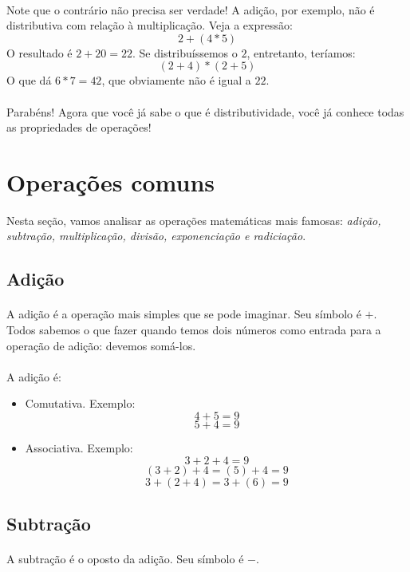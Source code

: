 \documentclass[12pt]{article}
\begin{document}
\paragraph{}
Note que o contrário não precisa ser verdade! A adição, por exemplo, não é 
distributiva com relação à multiplicação. Veja a expressão:
$$2 + (4*5)$$
O resultado é $2 + 20 = 22$. Se distribuíssemos o $2$, entretanto, teríamos:
$$(2+4) * (2+5)$$
O que dá $6*7 = 42$, que obviamente não é igual a $22$.
\paragraph{}
Parabéns! Agora que você já sabe o que é distributividade, você já conhece 
todas as propriedades de operações!

\section{Operações comuns}
Nesta seção, vamos analisar as operações matemáticas mais famosas: 
\textit{adição, subtração, multiplicação, divisão, exponenciação e radiciação}.

\subsection{Adição}
\paragraph{}
A adição é a operação mais simples que se pode imaginar. Seu símbolo é $+$.
Todos sabemos o que fazer quando temos dois números como entrada para a operação
de adição: devemos somá-los. 
\paragraph{}
A adição é:
\begin{itemize}
\item Comutativa. Exemplo:
$$4 + 5 = 9$$
$$5 + 4 = 9$$
\item Associativa. Exemplo:
$$3 + 2 + 4 = 9$$
$$(3 + 2) + 4 = (5) + 4 = 9$$
$$3 + (2 + 4) = 3 + (6) = 9$$
\end{itemize}

\subsection{Subtração}
\paragraph{}
A subtração é o oposto da adição. Seu símbolo é $-$.
\end{document}
